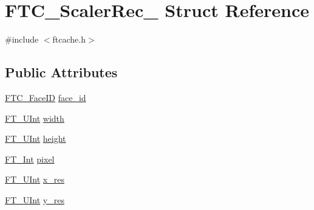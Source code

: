 \hypertarget{struct_f_t_c___scaler_rec__}{\section{F\-T\-C\-\_\-\-Scaler\-Rec\-\_\- Struct Reference}
\label{struct_f_t_c___scaler_rec__}
}


{\ttfamily \#include $<$ftcache.\-h$>$}

\subsection*{Public Attributes}
\begin{DoxyCompactItemize}
\item 
\hyperlink{ftcache_8h_a5da66c12c497bf5888638100876c7197}{F\-T\-C\-\_\-\-Face\-I\-D} \hyperlink{struct_f_t_c___scaler_rec___a8e963aa619409e646558fe7aa272e81f}{face\-\_\-id}
\item 
\hyperlink{fttypes_8h_abcb8db4dbf35d2b55a9e8c7b0926dc52}{F\-T\-\_\-\-U\-Int} \hyperlink{struct_f_t_c___scaler_rec___a11e13d907ca4661bf7c1d98fffecf321}{width}
\item 
\hyperlink{fttypes_8h_abcb8db4dbf35d2b55a9e8c7b0926dc52}{F\-T\-\_\-\-U\-Int} \hyperlink{struct_f_t_c___scaler_rec___a9b3a9b4d7148bbaa4daaae1e1fbb2dbc}{height}
\item 
\hyperlink{fttypes_8h_af90e5fb0d07e21be9fe6faa33f02484c}{F\-T\-\_\-\-Int} \hyperlink{struct_f_t_c___scaler_rec___ab78868341e2d66f17e6f1d77e9e054d2}{pixel}
\item 
\hyperlink{fttypes_8h_abcb8db4dbf35d2b55a9e8c7b0926dc52}{F\-T\-\_\-\-U\-Int} \hyperlink{struct_f_t_c___scaler_rec___a886c7c1230dc5d5e6b3fc32d06274752}{x\-\_\-res}
\item 
\hyperlink{fttypes_8h_abcb8db4dbf35d2b55a9e8c7b0926dc52}{F\-T\-\_\-\-U\-Int} \hyperlink{struct_f_t_c___scaler_rec___accb53c7a9aeebb41c05f48d14d3dfe71}{y\-\_\-res}
\end{DoxyCompactItemize}


